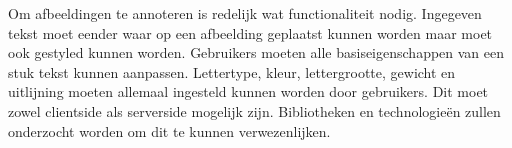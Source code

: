 Om afbeeldingen te annoteren is redelijk wat functionaliteit nodig. Ingegeven tekst moet eender waar op een afbeelding geplaatst kunnen worden maar moet ook gestyled kunnen worden. Gebruikers moeten alle basiseigenschappen van een stuk tekst kunnen aanpassen. Lettertype, kleur, lettergrootte, gewicht en uitlijning moeten allemaal ingesteld kunnen worden door gebruikers. Dit moet zowel clientside als serverside mogelijk zijn. Bibliotheken en technologie\"{e}n zullen onderzocht worden om dit te kunnen verwezenlijken.
\fi  

